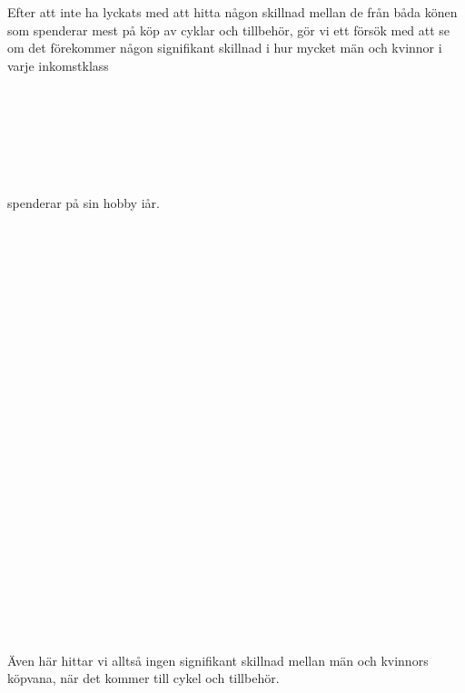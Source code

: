 \documentclass[]{article}
\begin{document}
Efter att inte ha lyckats med att hitta någon skillnad mellan de från båda könen som spenderar mest på köp av cyklar och tillbehör, gör vi ett försök med att se om det förekommer någon signifikant skillnad i hur mycket män och kvinnor i varje inkomstklass\\\\\\\\\\\\\\
spenderar på sin hobby iår.\\\\\\\\\\\\\\\\\\\\\\\\\\\\\\\\\\\\\\\\\\\\\\\\\\
Även här hittar vi alltså ingen signifikant skillnad mellan män och kvinnors köpvana, när det kommer till cykel och tillbehör.
\end{document}
